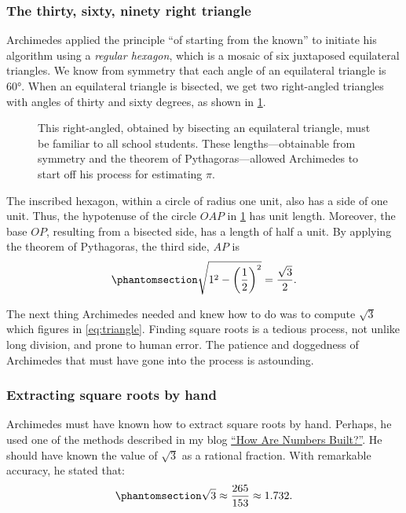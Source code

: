 \documentclass[
  a4paper,
]{article}
\begin{document}
\subsubsection{The thirty, sixty, ninety right
triangle}\label{the-thirty-sixty-ninety-right-triangle}

Archimedes applied the principle ``of starting from the known'' to
initiate his algorithm using a \emph{regular hexagon}, which is a mosaic
of six juxtaposed equilateral triangles. We know from symmetry that each
angle of an equilateral triangle is \(60°\). When an equilateral
triangle is bisected, we get two right-angled triangles with angles of
thirty and sixty degrees, as shown in \cref{fig:thirty-sixty}.

\begin{figure}
\centering

\caption{This right-angled, obtained by bisecting an equilateral
triangle, must be familiar to all school students. These
lengths---obtainable from symmetry and the theorem of
Pythagoras---allowed Archimedes to start off his process for estimating
\(\pi\).}\label{fig:thirty-sixty}
\end{figure}

The inscribed hexagon, within a circle of radius one unit, also has a
side of one unit. Thus, the hypotenuse of the circle \(OAP\) in
\cref{fig:thirty-sixty} has unit length. Moreover, the base \(OP\),
resulting from a bisected side, has a length of half a unit. By applying
the theorem of Pythagoras, the third side, \(AP\) is
\begin{equation}\phantomsection\label{eq:triangle}{
\sqrt{1^2 - \left(\frac{1}{2}\right)^2} = \frac{\sqrt{3}}{2}.
}\end{equation}

The next thing Archimedes needed and knew how to do was to compute
\(\sqrt{3}\) which figures in \cref{eq:triangle}. Finding square roots
is a tedious process, not unlike long division, and prone to human
error. The patience and doggedness of Archimedes that must have gone
into the process is astounding.

\subsubsection{Extracting square roots by
hand}\label{extracting-square-roots-by-hand}

Archimedes must have known how to extract square roots by hand. Perhaps,
he used one of the methods described in my blog
\href{https://swanlotus.netlify.app/blogs/how-are-numbers-built}{``How
Are Numbers Built?''}. He should have known the value of \(\sqrt{3}\) as
a rational fraction. With remarkable accuracy, he stated that:
\begin{equation}\phantomsection\label{eq:sqrt3}{\sqrt{3} \approx \frac{265}{153} \approx 1.732.
}\end{equation}
\end{document}
